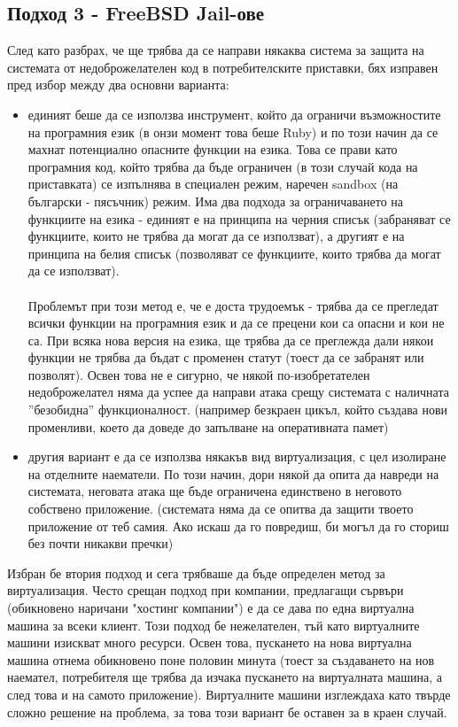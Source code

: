 \documentclass[pdftex,14pt,a4paper]{extreport}
\begin{document}
\subsection {Подход 3 - FreeBSD Jail-ове}
След като разбрах, че ще трябва да се направи някаква система за защита на системата от недоброжелателен код в потребителските приставки, бях изправен пред избор между два основни варианта:
\begin{itemize}
  \item единият беше да се използва инструмент, който да ограничи възможностите на програмния език (в онзи момент това беше Ruby) и по този начин да се махнат потенциално опасните функции на езика. Това се прави като програмния код, който трябва да бъде ограничен (в този случай кода на приставката) се изпълнява в специален режим, наречен sandbox (на български - пясъчник) режим. Има два подхода за ограничаването на функциите на езика - единият е на принципа на черния списък (забраняват се функциите, които не трябва да могат да се използват), а другият е на принципа на белия списък (позволяват се функциите, които трябва да могат да се използват).\\\\
    Проблемът при този метод е, че е доста трудоемък - трябва да се прегледат всички функции на програмния език и да се прецени кои са опасни и кои не са. При всяка нова версия на езика, ще трябва да се преглежда дали някои функции не трябва да бъдат с променен статут (тоест да се забранят или позволят). Освен това не е сигурно, че някой по-изобретателен недоброжелател няма да успее да направи атака срещу системата с наличната ''безобидна'' функционалност. (например безкраен цикъл, който създава нови променливи, което да доведе до запълване на оперативната памет)
  \item другия вариант е да се използва някакъв вид виртуализация, с цел изолиране на отделните наематели. По този начин, дори някой да опита да навреди на системата, неговата атака ще бъде ограничена единствено в неговото собствено приложение. (системата няма да се опитва да защити твоето приложение от теб самия. Ако искаш да го повредиш, би могъл да го сториш без почти никакви пречки)
\end{itemize}
Избран бе втория подход и сега трябваше да бъде определен метод за виртуализация. Често срещан подход при компании, предлагащи сървъри (обикновено наричани "хостинг компании") е да се дава по една виртуална машина за всеки клиент. Този подход бе нежелателен, тъй като виртуалните машини изискват много ресурси. Освен това, пускането на нова виртуална машина отнема обикновено поне половин минута (тоест за създаването на нов наемател, потребителя ще трябва да изчака пускането на виртуалната машина, а след това и на самото приложение). Виртуалните машини изглеждаха като твърде сложно решение на проблема, за това този вариант бе оставен за в краен случай.\\\\
\end{document}
